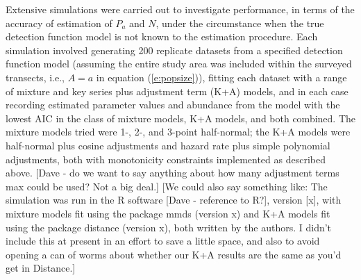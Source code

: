 \documentclass[useAMS,referee]{biom}
\begin{document}
Extensive simulations were carried out to investigate performance, in terms of the accuracy of estimation of $P_a$ and $N$, under the circumstance when the true detection function model is not known to the estimation procedure.  
 Each simulation involved generating 200 replicate datasets from a specified detection function model (assuming the entire study area was included within the surveyed transects, i.e., $A=a$ in equation (\ref{e:popsize})), fitting each dataset with a range of mixture and key series plus adjustment term (K+A) models, and in each case recording estimated parameter values and abundance from the model with the lowest AIC in the class of mixture models, K+A models, and both combined.  The mixture models tried were 1-, 2-, and 3-point half-normal; the K+A models were half-normal plus cosine adjustments and hazard rate plus simple polynomial adjustments, both with monotonicity constraints implemented as described above. [Dave - do we want to say anything about how many adjustment terms max could be used?  Not a big deal.]  [We could also say something like: The simulation was run in the R software [Dave - reference to R?], version [x], with mixture models fit using the package mmds (version x) and K+A models fit using the package distance (version x), both written by the authors.  I didn't include this at present in an effort to save a little space, and also to avoid opening a can of worms about whether our K+A results are the same as you'd get in Distance.]
\end{document}
